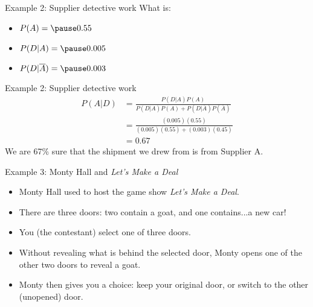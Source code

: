 \documentclass{beamer}\usepackage[]{graphicx}\usepackage[]{color}
\begin{document}
\begin{darkframes}
\begin{frame}{Example 2: Supplier detective work}
  What is:
  \begin{itemize}
    \item $P(A) = \pause 0.55$
    \item $P(D|A) = \pause 0.005$
    \item $P(D|\overline A) = \pause 0.003$
  \end{itemize}
  \pause
\end{frame}

\begin{frame}{Example 2: Supplier detective work}
  \begin{align*}
    P(A|D) &= \frac{P(D|A)P(A)}{P(D|A)P(A) + P(D|\overline A)P(\overline A)} \\
    &= \frac{(0.005)(0.55)}{(0.005)(0.55) + (0.003)(0.45)} \\
    &= 0.67
  \end{align*}
  \bigskip\pause
  We are 67\% sure that the shipment we drew from is from Supplier A.
  \lc
\end{frame}

\begin{frame}
\end{frame}

\begin{frame}{Example 3: Monty Hall and \emph{Let's Make a Deal}}
  \begin{itemize}[<+->]
    \item Monty Hall used to host the game show \emph{Let's Make a Deal}.
    \item There are three doors: two contain a goat, and one contains...\pause \alert{a new car}!
    \item You (the contestant) select one of three doors.
    \item Without revealing what is behind the selected door, Monty opens one of the other two doors to reveal a goat.
    \item Monty then gives you a choice: keep your original door, or switch to the other (unopened) door.
  \end{itemize}
\end{frame}

\begin{frame}
\end{frame}

\begin{frame}
\end{frame}

\begin{frame}
\end{frame}


\end{darkframes}
\end{document}

